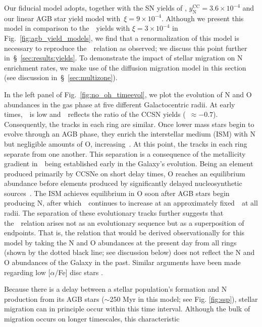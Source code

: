 \documentclass[ms.tex]{subfiles}
\begin{document}
Our fiducial model adopts, together with the SN yields of
\citet[][see discussion in~\S~\ref{sec:yields:ccsne}]{Johnson2021},
$y_\text{N}^\text{CC} = 3.6\times10^{-4}$ and our linear AGB star yield model
with~$\xi = 9\times10^{-4}$.
Although we present this model in comparison to the~\cristallo~yields with
$\xi = 3\times10^{-4}$ in Fig.~\ref{fig:agb_yield_models}, we find that a
renormalization of this model is necessary to reproduce the~\ohno~relation as
observed; we discuss this point further in~\S~\ref{sec:results:yields}.
To demonstrate the impact of stellar migration on N enrichment rates, we make
use of the diffusion migration model in this section (see discussion
in~\S~\ref{sec:multizone}).
\par
In the left panel of Fig.~\ref{fig:no_oh_timeevol}, we plot the evolution of N
and O abundances in the gas phase at five different Galactocentric radii.
At early times,~\oh~is low and~\no~reflects the ratio of the CCSN yields
(\no\subcc~$\approx -0.7$).
Consequently, the tracks in each ring are similar.
Once lower mass stars begin to evolve through an AGB phase, they enrich the
interstellar medium (ISM) with N but negligible amounts of O, increasing~\no.
At this point, the tracks in each ring separate from one another.
This separation is a consequence of the metallicity gradient in~\oh~being
established early in the Galaxy's evolution.
Being an element produced primarily by CCSNe on short delay times, O reaches
an equilibrium abundance before elements produced by significantly delayed
nucleosynthetic sources~\citep{Weinberg2017}.
The ISM achieves equilibrium in O soon after AGB stars begin producing N,
after which~\no~continues to increase at an approximately fixed~\oh~at all
radii.
The separation of these evolutionary tracks further suggests that
the~\ohno~relation arises not as an evolutionary sequence but as a
superposition of endpoints.
That is, the relation that would be derived observationally for this model by
taking the N and O abundances at the present day from all rings (shown by the
dotted black line; see discussion below) does not reflect the N and O
abundances of the Galaxy in the past.
Similar arguments have been made regarding low [$\alpha$/Fe] disc stars
\citep[e.g.][]{Schoenrich2009, Nidever2014, Buck2020, Sharma2021}.
\par
Because there is a delay between a stellar population's formation and N
production from its AGB stars ($\sim$250 Myr in this model; see Fig.
\ref{fig:ssp}), stellar migration can in principle occur within this time
interval.
Although the bulk of migration occurs on longer timescales, this characteristic
\end{document}
